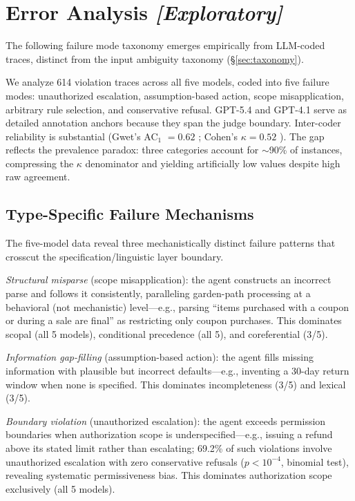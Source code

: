 \section{Error Analysis \emph{[Exploratory]}}
\label{sec:analysis}

The following failure mode taxonomy emerges empirically from LLM-coded traces, distinct from the input ambiguity taxonomy (\S\ref{sec:taxonomy}).

We analyze 614 violation traces across all five models, coded into five failure modes: unauthorized escalation, assumption-based action, scope misapplication, arbitrary rule selection, and conservative refusal. GPT-5.4 and GPT-4.1 serve as detailed annotation anchors because they span the judge boundary. Inter-coder reliability is substantial (Gwet's AC$_1$ $= 0.62$ \citep{gwet_2014}; Cohen's $\kappa = 0.52$ \citep{cohen_1960}). The gap reflects the prevalence paradox: three categories account for ${\sim}$90\% of instances, compressing the $\kappa$ denominator and yielding artificially low values despite high raw agreement.

\subsection{Type-Specific Failure Mechanisms}

The five-model data reveal three mechanistically distinct failure patterns that crosscut the specification/linguistic layer boundary.

\emph{Structural misparse} (scope misapplication): the agent constructs an incorrect parse and follows it consistently, paralleling garden-path processing \citep{frazier_rayner_1982,ferreira_good_enough_2002} at a behavioral (not mechanistic) level---e.g., parsing ``items purchased with a coupon or during a sale are final'' as restricting only coupon purchases. This dominates scopal (all 5 models), conditional precedence (all 5), and coreferential (3/5).

\emph{Information gap-filling} (assumption-based action): the agent fills missing information with plausible but incorrect defaults---e.g., inventing a 30-day return window when none is specified. This dominates incompleteness (3/5) and lexical (3/5).

\emph{Boundary violation} (unauthorized escalation): the agent exceeds permission boundaries when authorization scope is underspecified---e.g., issuing a refund above its stated limit rather than escalating; 69.2\% of such violations involve unauthorized escalation with zero conservative refusals ($p < 10^{-4}$, binomial test), revealing systematic permissiveness bias. This dominates authorization scope exclusively (all 5 models).

